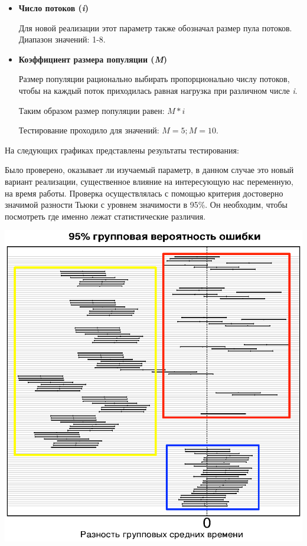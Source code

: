 \begin{itemize}
    \item \textbf{Число потоков (\textit{i})}

        Для новой реализации этот параметр также
        обозначал размер пула потоков.
        Диапазон значений: 1-8.
    \item \textbf{Коэффициент размера популяции (\textit{M})}

        Размер популяции рационально выбирать
        пропорционально числу потоков,
        чтобы на каждый поток приходилась
        равная нагрузка при различном
        числе \textit{i}.

        Таким образом размер популяции равен:
        \begin{math}M * i\end{math}

        Тестирование проходило для значений:
        \begin{math}M = 5; M = 10\end{math}.
\end{itemize}

На следующих графиках представлены результаты тестирования:




Было проверено, оказывает ли изучаемый параметр,
в данном случае это новый вариант реализации,
существенное влияние на интересующую нас
переменную, на время работы.
Проверка осуществлялась с помощью
критерия достоверно значимой
разности Тьюки
с уровнем значимости в 95\%.
Он необходим, чтобы посмотреть
где именно лежат статистические различия.

\bigskip
\includegraphics{tukey}

